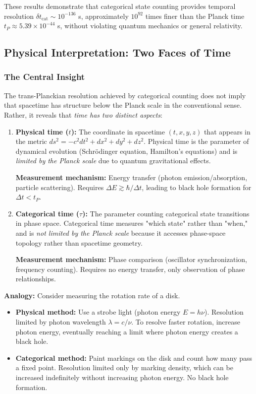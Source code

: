 \documentclass[twocolumn,10pt]{article}
\theoremstyle{remark}
\begin{document}
These results demonstrate that categorical state counting provides temporal resolution $\delta t_{\text{cat}} \sim 10^{-136}$ s, approximately $10^{92}$ times finer than the Planck time $t_P \approx 5.39 \times 10^{-44}$ s, without violating quantum mechanics or general relativity.

\subsection{Physical Interpretation: Two Faces of Time}

\subsubsection{The Central Insight}

The trans-Planckian resolution achieved by categorical counting does not imply that spacetime has structure below the Planck scale in the conventional sense. Rather, it reveals that \textit{time has two distinct aspects}:

\begin{enumerate}
    \item \textbf{Physical time ($t$):} The coordinate in spacetime $(t, x, y, z)$ that appears in the metric $ds^2 = -c^2 dt^2 + dx^2 + dy^2 + dz^2$. Physical time is the parameter of dynamical evolution (Schrödinger equation, Hamilton's equations) and is \textit{limited by the Planck scale} due to quantum gravitational effects.
    
    \textbf{Measurement mechanism:} Energy transfer (photon emission/absorption, particle scattering). Requires $\Delta E \gtrsim \hbar/\Delta t$, leading to black hole formation for $\Delta t < t_P$.
    
    \item \textbf{Categorical time ($\tau$):} The parameter counting categorical state transitions in phase space. Categorical time measures "which state" rather than "when," and is \textit{not limited by the Planck scale} because it accesses phase-space topology rather than spacetime geometry.
    
    \textbf{Measurement mechanism:} Phase comparison (oscillator synchronization, frequency counting). Requires no energy transfer, only observation of phase relationships.
\end{enumerate}

\textbf{Analogy:} Consider measuring the rotation rate of a disk.
\begin{itemize}
    \item \textbf{Physical method:} Use a strobe light (photon energy $E = h\nu$). Resolution limited by photon wavelength $\lambda = c/\nu$. To resolve faster rotation, increase photon energy, eventually reaching a limit where photon energy creates a black hole.
    
    \item \textbf{Categorical method:} Paint markings on the disk and count how many pass a fixed point. Resolution limited only by marking density, which can be increased indefinitely without increasing photon energy. No black hole formation.
\end{itemize}
\end{document}
